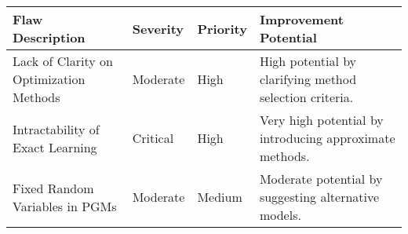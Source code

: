 \documentclass{article}
\begin{document}
\begin{table}[h]
\centering
\begin{tabular}{|>{\raggedright\arraybackslash}p{4cm}|>{\centering\arraybackslash}p{2cm}|>{\centering\arraybackslash}p{2cm}|>{\raggedright\arraybackslash}p{4cm}|}
\hline
\textbf{Flaw Description} & \textbf{Severity} & \textbf{Priority} & \textbf{Improvement Potential} \\ \hline
Lack of Clarity on Optimization Methods & Moderate & High & High potential by clarifying method selection criteria. \\ \hline
Intractability of Exact Learning & Critical & High & Very high potential by introducing approximate methods. \\ \hline
Fixed Random Variables in PGMs & Moderate & Medium & Moderate potential by suggesting alternative models. \\ \hline
\end{tabular}
\end{table}
\end{document}
